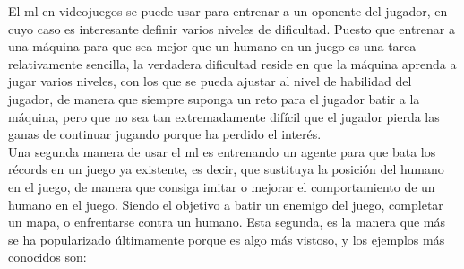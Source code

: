 El \gls{ml} en videojuegos se puede usar para entrenar a un oponente del jugador, en cuyo caso es interesante definir varios niveles de dificultad. Puesto que entrenar a una máquina para que sea mejor que un humano en un juego es una tarea relativamente sencilla, la verdadera dificultad reside en que la máquina aprenda a jugar varios niveles, con los que se pueda ajustar al nivel de habilidad del jugador, de manera que siempre suponga un reto para el jugador batir a la máquina, pero que no sea tan extremadamente difícil que el jugador pierda las ganas de continuar jugando porque ha perdido el interés.
\\
Una segunda manera de usar el \gls{ml} es entrenando un agente para que bata los récords en un juego ya existente, es decir, que sustituya la posición del humano en el juego, de manera que consiga imitar o mejorar el comportamiento de un humano en el juego. Siendo el objetivo a batir un enemigo del juego, completar un mapa, o enfrentarse contra un humano. Esta segunda, es la manera que más se ha popularizado últimamente porque es algo más vistoso, y los ejemplos más conocidos son:
